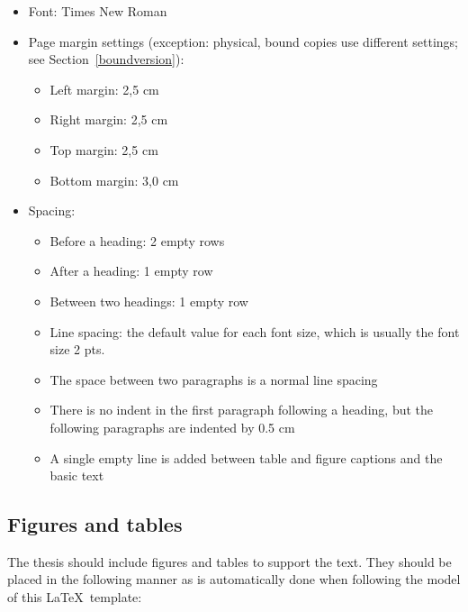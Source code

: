 \begin{itemize}
  \item Font: Times New Roman
  \item Page margin settings (exception: physical, bound copies use different settings; see Section~\ref{boundversion}):
    \begin{itemize}
      \item Left margin: 2,5 cm
      \item Right margin: 2,5 cm
      \item Top margin: 2,5 cm
      \item Bottom margin: 3,0 cm
    \end{itemize}
  \item Spacing:
    \begin{itemize}
      \item Before a heading: 2 empty rows
      \item After a heading: 1 empty row
      \item Between two headings: 1 empty row
      \item Line spacing: the default value for each font size, which
        is usually the font size 2 pts.
      \item The space between two paragraphs is a normal line spacing
      \item There is no indent in the first paragraph following a
        heading, but the following
        paragraphs are indented by 0.5 cm
      \item A single empty line is added between table and figure
        captions and the basic text
    \end{itemize}
\end{itemize}

\subsection{Figures and tables}
The thesis should include figures and tables to support the text.
They should be placed in the following manner as is automatically
done when following the model of this \LaTeX\ template:

